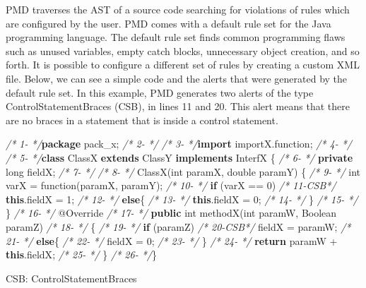 \documentclass[
]{article}
\newenvironment{Shaded}{\begin{snugshade}}{\end{snugshade}}
\newcommand{\AttributeTok}[1]{\textcolor[rgb]{0.77,0.63,0.00}{#1}}
\newcommand{\BuiltInTok}[1]{#1}
\newcommand{\CommentTok}[1]{\textcolor[rgb]{0.56,0.35,0.01}{\textit{#1}}}
\newcommand{\DataTypeTok}[1]{\textcolor[rgb]{0.13,0.29,0.53}{#1}}
\newcommand{\DecValTok}[1]{\textcolor[rgb]{0.00,0.00,0.81}{#1}}
\newcommand{\FunctionTok}[1]{\textcolor[rgb]{0.00,0.00,0.00}{#1}}
\newcommand{\ImportTok}[1]{#1}
\newcommand{\KeywordTok}[1]{\textcolor[rgb]{0.13,0.29,0.53}{\textbf{#1}}}
\newcommand{\NormalTok}[1]{#1}
\begin{document}
PMD traverses the AST of a source code searching for violations of rules
which are configured by the user. PMD comes with a default rule set for
the Java programming language. The default rule set finds common
programming flaws such as unused variables, empty catch blocks,
unnecessary object creation, and so forth. It is possible to configure a
different set of rules by creating a custom XML file. Below, we can see
a simple code and the alerts that were generated by the default rule
set. In this example, PMD generates two alerts of the type
ControlStatementBraces (CSB), in lines 11 and 20. This alert means that
there are no braces in a statement that is inside a control statement.

\small

\normalsize

\newpage

\small

\begin{Shaded}
\begin{Highlighting}[]
\CommentTok{/*  1{-}   */}\KeywordTok{package}\ImportTok{ pack\_x;}
\CommentTok{/*  2{-}   */}  
\CommentTok{/*  3{-}   */}\KeywordTok{import}\ImportTok{ importX.function;}
\CommentTok{/*  4{-}   */}
\CommentTok{/*  5{-}   */}\KeywordTok{class}\NormalTok{ ClassX }\KeywordTok{extends}\NormalTok{ ClassY }\KeywordTok{implements}\NormalTok{ InterfX \{}
\CommentTok{/*  6{-}   */}    \KeywordTok{private} \DataTypeTok{long}\NormalTok{ fieldX;}
\CommentTok{/*  7{-}   */}    
\CommentTok{/*  8{-}   */}    \FunctionTok{ClassX}\NormalTok{(}\DataTypeTok{int}\NormalTok{ paramX, }\DataTypeTok{double}\NormalTok{ paramY) \{}
\CommentTok{/*  9{-}   */}        \DataTypeTok{int}\NormalTok{ varX = }\FunctionTok{function}\NormalTok{(paramX, paramY);}
\CommentTok{/* 10{-}   */}        \KeywordTok{if}\NormalTok{ (varX == }\DecValTok{0}\NormalTok{)}
\CommentTok{/* 11{-}CSB*/}            \KeywordTok{this}\NormalTok{.}\FunctionTok{fieldX}\NormalTok{ = }\DecValTok{1}\NormalTok{;}
\CommentTok{/* 12{-}   */}        \KeywordTok{else}\NormalTok{\{}
\CommentTok{/* 13{-}   */}            \KeywordTok{this}\NormalTok{.}\FunctionTok{fieldX}\NormalTok{ = }\DecValTok{0}\NormalTok{;}
\CommentTok{/* 14{-}   */}\NormalTok{     \}}
\CommentTok{/* 15{-}   */}\NormalTok{    \}}
\CommentTok{/* 16{-}   */}    \AttributeTok{@Override}
\CommentTok{/* 17{-}   */}    \KeywordTok{public} \DataTypeTok{int} \FunctionTok{methodX}\NormalTok{(}\DataTypeTok{int}\NormalTok{ paramW, }\BuiltInTok{Boolean}\NormalTok{ paramZ)}
\CommentTok{/* 18{-}   */}\NormalTok{    \{}
\CommentTok{/* 19{-}   */}        \KeywordTok{if}\NormalTok{ (paramZ)}
\CommentTok{/* 20{-}CSB*/}\NormalTok{            fieldX = paramW;}
\CommentTok{/* 21{-}   */}        \KeywordTok{else}\NormalTok{\{}
\CommentTok{/* 22{-}   */}\NormalTok{            fieldX = }\DecValTok{0}\NormalTok{;}
\CommentTok{/* 23{-}   */}\NormalTok{     \}}
\CommentTok{/* 24{-}   */}        \KeywordTok{return}\NormalTok{ paramW + }\KeywordTok{this}\NormalTok{.}\FunctionTok{fieldX}\NormalTok{;}
\CommentTok{/* 25{-}   */}\NormalTok{     \}}
\CommentTok{/* 26{-}   */}\NormalTok{\}  }


\NormalTok{CSB: ControlStatementBraces}
\end{Highlighting}
\end{Shaded}
\end{document}
